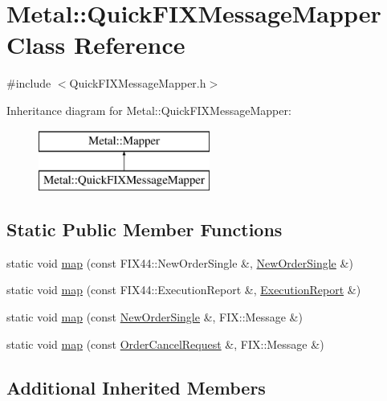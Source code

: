\hypertarget{classMetal_1_1QuickFIXMessageMapper}{}\section{Metal\+:\+:Quick\+F\+I\+X\+Message\+Mapper Class Reference}
\label{classMetal_1_1QuickFIXMessageMapper}


{\ttfamily \#include $<$Quick\+F\+I\+X\+Message\+Mapper.\+h$>$}

Inheritance diagram for Metal\+:\+:Quick\+F\+I\+X\+Message\+Mapper\+:\begin{figure}[H]
\begin{center}
\leavevmode
\includegraphics[height=2.000000cm]{classMetal_1_1QuickFIXMessageMapper}
\end{center}
\end{figure}
\subsection*{Static Public Member Functions}
\begin{DoxyCompactItemize}
\item 
static void \hyperlink{classMetal_1_1QuickFIXMessageMapper_ad42b0f6ed92b6e777e3716de55b20f21}{map} (const F\+I\+X44\+::\+New\+Order\+Single \&, \hyperlink{classMetal_1_1NewOrderSingle}{New\+Order\+Single} \&)
\item 
static void \hyperlink{classMetal_1_1QuickFIXMessageMapper_a98184463c76af4e0a21e8dfbd4b61af4}{map} (const F\+I\+X44\+::\+Execution\+Report \&, \hyperlink{namespaceMetal_af4294c176f6aecf9f75e9b106b117aa1}{Execution\+Report} \&)
\item 
static void \hyperlink{classMetal_1_1QuickFIXMessageMapper_ad5c9c32bc745db35e7d2a472cb204514}{map} (const \hyperlink{classMetal_1_1NewOrderSingle}{New\+Order\+Single} \&, F\+I\+X\+::\+Message \&)
\item 
static void \hyperlink{classMetal_1_1QuickFIXMessageMapper_ab7692db7b3f7b616acd7c6e9fc024d2c}{map} (const \hyperlink{classMetal_1_1OrderCancelRequest}{Order\+Cancel\+Request} \&, F\+I\+X\+::\+Message \&)
\end{DoxyCompactItemize}
\subsection*{Additional Inherited Members}


